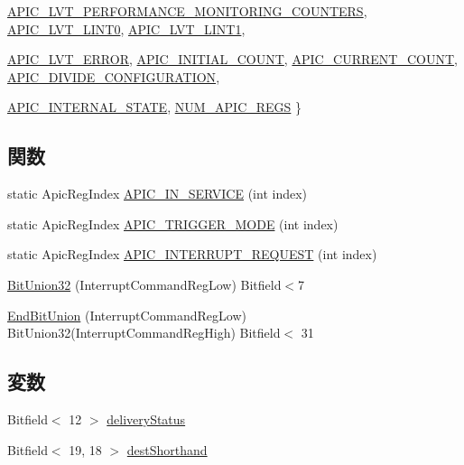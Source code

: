 \begin{DoxyCompactItemize}
\hyperlink{namespaceX86ISA_aaa839fcdf6f426c03c7382fcc29ac649a769c40616c8b9b7de024051b04227dbb}{APIC\_\-LVT\_\-PERFORMANCE\_\-MONITORING\_\-COUNTERS}, 
\hyperlink{namespaceX86ISA_aaa839fcdf6f426c03c7382fcc29ac649ab07382707bac04fc055c6ca577127989}{APIC\_\-LVT\_\-LINT0}, 
\hyperlink{namespaceX86ISA_aaa839fcdf6f426c03c7382fcc29ac649ac67e062e54bcdd8c8003f591079d8e51}{APIC\_\-LVT\_\-LINT1}, 
\par
\hyperlink{namespaceX86ISA_aaa839fcdf6f426c03c7382fcc29ac649ab452bdc9e036517c83e9bb804123bce8}{APIC\_\-LVT\_\-ERROR}, 
\hyperlink{namespaceX86ISA_aaa839fcdf6f426c03c7382fcc29ac649ae716a6476f2512f58b1a277adc2a2e7d}{APIC\_\-INITIAL\_\-COUNT}, 
\hyperlink{namespaceX86ISA_aaa839fcdf6f426c03c7382fcc29ac649a58280c164e1ac7ce1f96388426eedae2}{APIC\_\-CURRENT\_\-COUNT}, 
\hyperlink{namespaceX86ISA_aaa839fcdf6f426c03c7382fcc29ac649a8222bef49f213396d8e7355618db1a19}{APIC\_\-DIVIDE\_\-CONFIGURATION}, 
\par
\hyperlink{namespaceX86ISA_aaa839fcdf6f426c03c7382fcc29ac649a6cee13db3ff4d842d6f69f8b4d3ebec7}{APIC\_\-INTERNAL\_\-STATE}, 
\hyperlink{namespaceX86ISA_aaa839fcdf6f426c03c7382fcc29ac649acac3cc02926b9ee42adeac70e95690ec}{NUM\_\-APIC\_\-REGS}
 \}
\end{DoxyCompactItemize}
\subsection*{関数}
\begin{DoxyCompactItemize}
\item 
static ApicRegIndex \hyperlink{namespaceX86ISA_a5c1e138a13b5dfdeed52ed0ebf585fe2}{APIC\_\-IN\_\-SERVICE} (int index)
\item 
static ApicRegIndex \hyperlink{namespaceX86ISA_afdf90895c5487dc266f742f30bb4a568}{APIC\_\-TRIGGER\_\-MODE} (int index)
\item 
static ApicRegIndex \hyperlink{namespaceX86ISA_a3c8c801a8304b85b8c6ae6ca3ac00f74}{APIC\_\-INTERRUPT\_\-REQUEST} (int index)
\item 
\hyperlink{namespaceX86ISA_a1c8b28eb3a1018e40f0dce9c3fcd7b39}{BitUnion32} (InterruptCommandRegLow) Bitfield$<$7
\item 
\hyperlink{namespaceX86ISA_a269890a6e5fc8ed9f9d9da9aae67dbdd}{EndBitUnion} (InterruptCommandRegLow) BitUnion32(InterruptCommandRegHigh) Bitfield$<$ 31
\end{DoxyCompactItemize}
\subsection*{変数}
\begin{DoxyCompactItemize}
\item 
Bitfield$<$ 12 $>$ \hyperlink{namespaceX86ISA_abe55336004f210f2b2c0421f55ea7c3e}{deliveryStatus}
\item 
Bitfield$<$ 19, 18 $>$ \hyperlink{namespaceX86ISA_a4b961bdf11c0bc3384446cb6b52a09fe}{destShorthand}
\end{DoxyCompactItemize}

